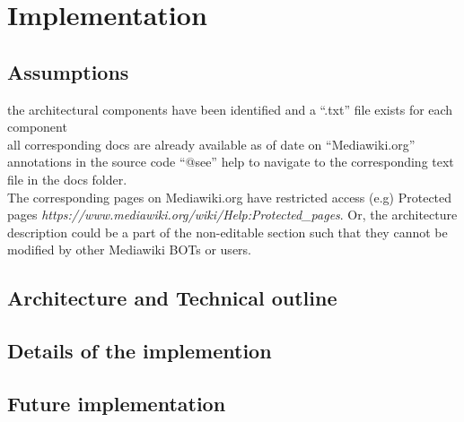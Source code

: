 \chapter{Implementation}\label{chapter:Implementation}

\section{Assumptions}
\indent the architectural components have been identified and a \enquote{.txt} file exists for each component
\\\indent all corresponding docs are already available as of date on  \enquote{Mediawiki.org}
\\\indent annotations in the source code \enquote{@see} help to navigate to the corresponding text file in the docs folder.
\\\indent The corresponding pages on Mediawiki.org have restricted access (e.g) Protected pages \emph{https://www.mediawiki.org/wiki/Help:Protected\_pages}. Or, the architecture description could be a part of the non-editable section such that they cannot be modified by other Mediawiki BOTs or users.
\section{Architecture and Technical outline}
\section{Details of the implemention}

\section{Future implementation}

		

